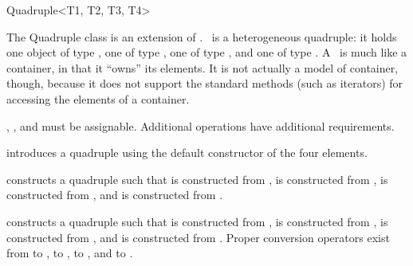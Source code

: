 \begin{ccRefClass}{Quadruple<T1, T2, T3, T4>}
  
  \ccDefinition The Quadruple class is an extension of
  .  \ccRefName\ is a heterogeneous quadruple: it holds
  one object of type , one of type , one of type
  , and one of type .  A \ccRefName\ is much like a
  container, in that it ``owns'' its elements. It is not actually a
  model of container, though, because it does not support the standard
  methods (such as iterators) for accessing the elements of a
  container.

  
  \ccRequirements {}, ,  and  must be
  assignable. Additional operations have additional requirements.


  \ccTypes
  \ccGlue
  \ccGlue
  \ccGlue

  \ccGlue
  \ccGlue
  \ccGlue

  \ccCreation
  
   {introduces a quadruple using the
    default constructor of the four elements.}
  
   {constructs a
    quadruple such that  is constructed from ,
     is constructed from ,  is
    constructed from , and  is constructed from
    .}
  
   {constructs a quadruple such that
     is constructed from ,  is
    constructed from ,  is constructed from ,
    and  is constructed from . \ccRequire Proper
    conversion operators exist from  to ,  to
    ,  to , and  to .  }
   

\end{ccRefClass}
